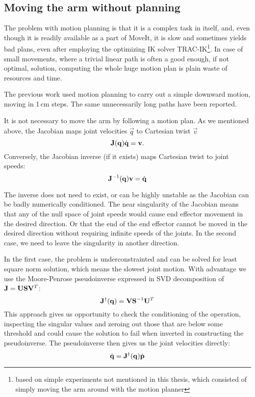 \documentclass[buriama8_dp.tex]{subfiles}
\begin{document}
\subsection{Moving the arm without planning}
\label{subsec:no_plan}

The problem with motion planning is that it is a complex task in itself, and, even though it is readily available as a part of MoveIt, it is slow and sometimes yields bad plans, even after employing the optimizing IK solver TRAC-IK\footnote{based on simple experiments not mentioned in this thesis, which consisted of simply moving the arm around with the motion planner}. In case of small movements, where a trivial linear path is often a good enough, if not optimal, solution, computing the whole huge motion plan is plain waste of resources and time.

The previous work \cite{vojta} used motion planning to carry out a simple downward motion, moving in 1\,cm steps. The same unnecessarily long paths have been reported.

It is not necessary to move the arm by following a motion plan. As we mentioned above, the Jacobian maps joint velocities \(\dot{\vec{q}}\) to Cartesian twist \(\vec{v}\)
\[
\mathbf{J}(\mathbf{q}) \dot{\mathbf{q}} = \mathbf{v}.
\]
Conversely, the Jacobian inverse (if it exists) maps Cartesian twist to joint speeds:
\[
\mathbf{J}^{-1}(\mathbf{q}) \mathbf{v} = \dot{\mathbf{q}}
\]

The inverse does not need to exist, or can be highly unstable as the Jacobian can be badly numerically conditioned. The near singularity of the Jacobian means that any of the null space of joint speeds would cause end effector movement in the desired direction. Or that the end of the end effector cannot be moved in the desired direction without requiring infinite speeds of the joints. In the second case, we need to leave the singularity in another direction.

In the first case, the problem is underconstrainted and can be solved for least square norm solution, which means the slowest joint motion. With advantage we use the Moore-Penrose pseudoinverse expressed in SVD decomposition of \(\mathbf{J} = \mathbf{U} \mathbf{S} \mathbf{V}^T \):
\[
\mathbf{J}^\dagger(\mathbf{q}) = \mathbf{V} \mathbf{S}^{-1} \mathbf{U}^T
\]
This approach gives us opportunity to check the conditioning of the operation, inspecting the singular values and zeroing out those that are below some threshold and could cause the solution to fail when inverted in constructing the pseudoinverse. The pseudoinverse then gives us the joint velocities directly:
\[
 \dot{\mathbf{q}} = \mathbf{J}^\dagger(\mathbf{q}) \dot{\mathbf{p}}
\]
\end{document}
